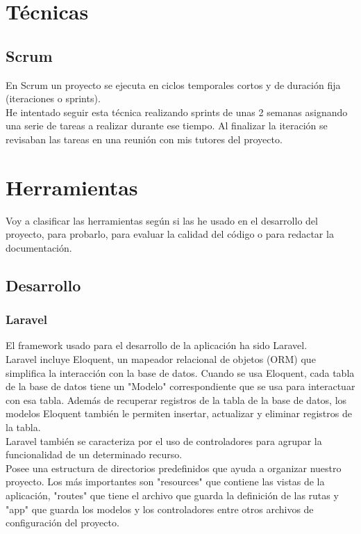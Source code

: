 \section{Técnicas}
\subsection{Scrum}
En Scrum un proyecto se ejecuta en ciclos temporales cortos y de duración fija (iteraciones o sprints).\cite{scrum:definicion}\\He intentado seguir esta técnica realizando sprints de unas 2 semanas asignando una serie de tareas a realizar durante ese tiempo. Al finalizar la iteración se revisaban las tareas en una reunión con mis tutores del proyecto. 
\section{Herramientas}
Voy a clasificar las herramientas según si las he usado en el desarrollo del proyecto, para probarlo, para evaluar la calidad del código o para redactar la documentación.  
\subsection{Desarrollo}
\subsubsection{Laravel}
El framework usado para el desarrollo de la aplicación ha sido Laravel.\\
Laravel incluye Eloquent, un mapeador relacional de objetos (ORM) que simplifica la interacción con la base de datos. Cuando se usa Eloquent, cada tabla de la base de datos tiene un "Modelo" correspondiente que se usa para interactuar con esa tabla. Además de recuperar registros de la tabla de la base de datos, los modelos Eloquent también le permiten insertar, actualizar y eliminar registros de la tabla.\cite{Laravel:modelos}\\
Laravel también se caracteriza por el uso de controladores para agrupar la funcionalidad de un determinado recurso.\cite{Laravel:controladores}\\
Posee una estructura de directorios predefinidos que ayuda a organizar nuestro proyecto. Los más importantes son "resources" que contiene las vistas de la aplicación, "routes" que tiene el archivo que guarda la definición de las rutas y "app" que guarda los modelos y los controladores entre otros archivos de configuración del proyecto.\\

